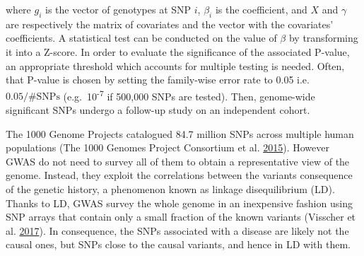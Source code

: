 \documentclass[
  11pt,
]{env/yjiao}
\begin{document}
where \(g_i\) is the vector of genotypes at SNP \(i\), \(\beta_i\) is the coefficient, and \(X\) and \(\gamma\) are respectively the matrix of covariates and the vector with the covariates' coefficients. A statistical test can be conducted on the value of \(\beta\) by transforming it into a Z-score. In order to evaluate the significance of the associated P-value, an appropriate threshold which accounts for multiple testing is needed. Often, that P-value is chosen by setting the family-wise error rate to 0.05 i.e.~\(0.05/\text{\# SNPs}\) (e.g.~10\textsuperscript{-7} if 500,000 SNPs are tested). Then, genome-wide significant SNPs undergo a follow-up study on an independent cohort.

The 1000 Genome Projects catalogued 84.7 million SNPs across multiple human populations (The 1000 Genomes Project Consortium et al. \protect\hyperlink{ref-the_1000_genomes_project_consortium_global_2015}{2015}). However GWAS do not need to survey all of them to obtain a representative view of the genome. Instead, they exploit the correlations between the variants consequence of the genetic history, a phenomenon known as linkage disequilibrium (LD). Thanks to LD, GWAS survey the whole genome in an inexpensive fashion using SNP arrays that contain only a small fraction of the known variants (Visscher et al. \protect\hyperlink{ref-visscher_10_2017}{2017}). In consequence, the SNPs associated with a disease are likely not the causal ones, but SNPs close to the causal variants, and hence in LD with them.
\end{document}
